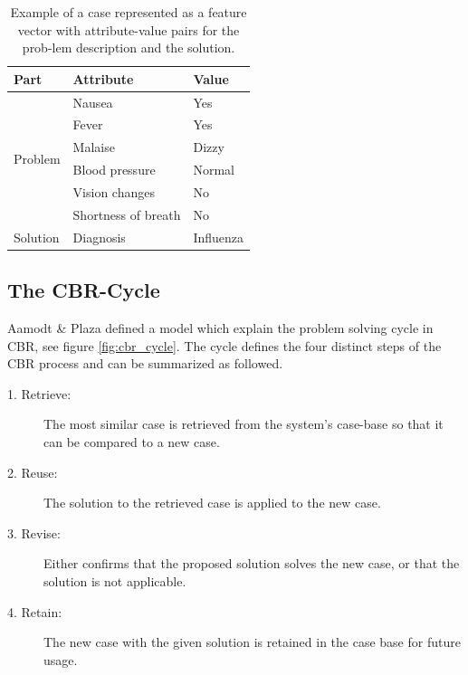 \begin{table}[h]
\centering
\caption{Example of a case represented as a feature vector with attribute-value pairs for the prob-lem description and the solution.}
\label{tab:example_case}
\begin{tabular}{|l|l|l|}

\hline
 \textbf{Part} & \textbf{Attribute} & \textbf{Value} \\ \hline \hline
\multicolumn{1}{|l|}{\multirow{6}{*}{Problem}} & Nausea & Yes \\ \cline{2-3} 
\multicolumn{1}{|l|}{} & Fever & Yes \\ \cline{2-3} 
\multicolumn{1}{|l|}{} & Malaise & Dizzy \\ \cline{2-3} 
\multicolumn{1}{|l|}{} & Blood pressure & Normal \\ \cline{2-3} 
\multicolumn{1}{|l|}{} & Vision changes & No \\ \cline{2-3} 
\multicolumn{1}{|l|}{} & Shortness of breath & No \\ \hline
\multicolumn{1}{|l|}{Solution} & Diagnosis & Influenza \\ \hline
\end{tabular}
\end{table}

\subsection{The CBR-Cycle}\label{sec:cbr-cycle}

Aamodt \& Plaza \cite{aamodt1994case} defined a model which explain the problem solving cycle in CBR, see figure \ref{fig:cbr_cycle}. The cycle defines the four distinct steps of the CBR process and can be summarized as followed.

\begin{description}
\item [1. Retrieve:] The most similar case is retrieved from the system's case-base so that it can be compared to a new case.
\item [2. Reuse:] The solution to the retrieved case is applied to the new case.
\item [3. Revise:] Either confirms that the proposed solution solves the new case, or that the solution is not applicable.
\item [4. Retain:] The new case with the given solution is retained in the case base for future usage.
\end{description}

